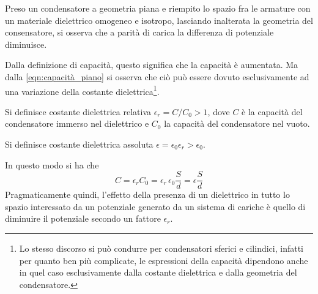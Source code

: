 \label{par:costante_dielettrica}
\begin{obses}
Preso un condensatore a geometria piana e riempito lo spazio fra le armature con un materiale dielettrico omogeneo e isotropo,
lasciando inalterata la geometria del consensatore, si osserva che a parità di carica la differenza di potenziale diminuisce.
\end{obses}
Dalla definizione di capacità, questo significa che la capacità è aumentata.
Ma dalla \eqref{eqn:capacità_piano} si osserva che ciò può essere dovuto esclusivamente
ad una variazione della costante dielettrica\footnote{Lo stesso discorso si può condurre per condensatori sferici e cilindici,
infatti per quanto ben più complicate, le espressioni della capacità dipendono anche in quel caso esclusivamente
dalla costante dielettrica e dalla geometria del condensatore.}.
\begin{defn}
  Si definisce costante dielettrica relativa $\epsilon_r=C/C_0>1$,
  dove $C$ è la capacità del condensatore immerso nel dielettrico e $C_0$ la capacità del condensatore nel vuoto.
\end{defn}

\begin{defn}
  Si definisce costante dielettrica assoluta $\epsilon=\epsilon_0\epsilon_r>\epsilon_0$.
\end{defn}
In questo modo si ha che
\[
C=\epsilon_r C_0=\epsilon_r\,\epsilon_0\frac{S}{d}=\epsilon\frac{S}{d}
\]
Pragmaticamente quindi, l'effetto della presenza di un dielettrico in tutto lo spazio interessato da un potenziale
generato da un sistema di cariche è quello di diminuire il potenziale secondo un fattore $\epsilon_r$.
